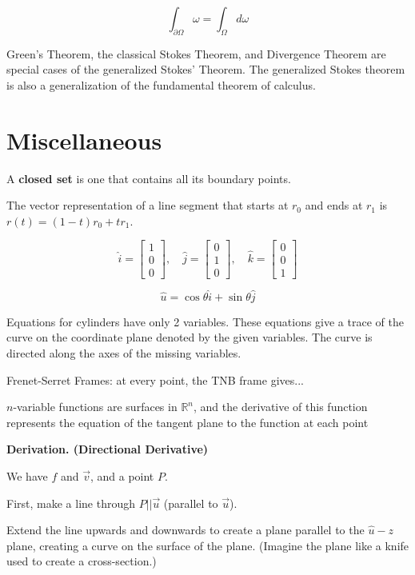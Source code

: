$$\int_{\partial \Omega}\omega = \int_{\Omega} d\omega $$

Green's Theorem, the classical Stokes Theorem, and Divergence Theorem are special cases of the generalized Stokes' Theorem. The generalized Stokes theorem is also a generalization of the fundamental theorem of calculus.

\pagebreak \section{Miscellaneous}

A \textbf{closed set} is one that contains all its boundary points.

The vector representation of a line segment that starts at $r_{0}$ and ends at $r_{1}$ is $r(t) = (1-t)r_{0} + tr_{1}$.

$$\hat{i} = \begin{bmatrix}
1\\
0\\
0
\end{bmatrix},
\quad
\hat{j} = \begin{bmatrix}
0\\
1\\
0
\end{bmatrix},
\quad
\hat{k} = \begin{bmatrix}
0\\
0\\
1
\end{bmatrix}$$

$$\hat{u} = \cos{\theta}\hat{i} + \sin{\theta}\hat{j}$$

Equations for cylinders have only 2 variables. These equations give a trace of the curve on the coordinate plane denoted by the given variables. The curve is directed along the axes of the missing variables.

Frenet-Serret Frames: at every point, the TNB frame gives...

$n$-variable functions are surfaces in $\mathbb{R}^{n}$, and the derivative of this function represents the equation of the tangent plane to the function at each point

\textbf{Derivation. (Directional Derivative)}

We have $f$ and $\vec{v}$, and a point $P$.

First, make a line through $P || \vec{u}$ (parallel to $\vec{u}$).

Extend the line upwards and downwards to create a plane parallel to the $\hat{u}-z$ plane, creating a curve on the surface of the plane. (Imagine the plane like a knife used to create a cross-section.)


